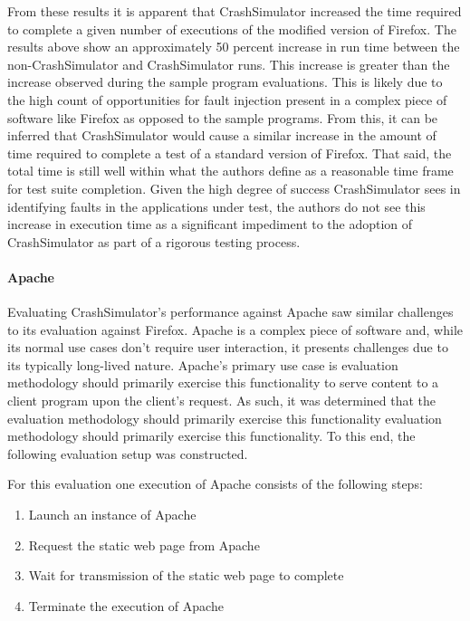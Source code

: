                 From these results it is apparent that CrashSimulator  increased the time required to complete a given
                number of executions of the modified version of Firefox. The results above show an approximately 50
                percent increase in run time between the non-CrashSimulator and CrashSimulator runs. This increase is
                greater than the increase observed during the sample program evaluations. This is likely due to the high
                count of opportunities for fault injection present in a complex piece of software like Firefox as
                opposed to the sample programs. From this, it can be inferred that CrashSimulator would cause a similar
                increase in the amount of time required to complete a test of a standard version of Firefox. That said,
                the total time is still well within what the authors define as a reasonable time frame for test suite
                completion. Given the high degree of success CrashSimulator sees in identifying faults in the
                applications under test, the authors do not see this increase in execution time as a significant
                impediment to the adoption of CrashSimulator as part of a rigorous testing process.

            \paragraph{Apache}

                Evaluating CrashSimulator's performance against Apache saw similar challenges to its evaluation against
                Firefox. Apache is a complex piece of software and, while its normal use cases don't require user
                interaction, it presents challenges due to its typically long-lived nature. Apache's primary use case is
                evaluation methodology should primarily exercise this functionality to serve content to a client program
                upon the client's request. As such, it was determined that the evaluation methodology should primarily
                exercise this functionality evaluation methodology should primarily exercise this functionality. To this
                end, the following evaluation setup was constructed.

                For this evaluation one execution of Apache consists of the following steps:

                \begin{enumerate}
                    \item{} Launch an instance of Apache
                    \item{} Request the static web page from Apache
                    \item{} Wait for transmission of the static web page to complete
                    \item{} Terminate the execution of Apache
                \end{enumerate}

